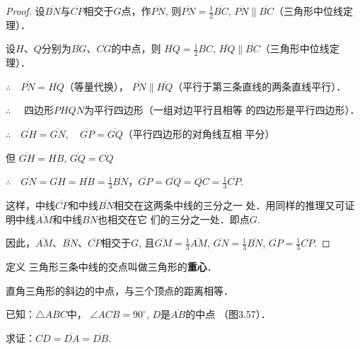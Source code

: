 \begin{proof}
设$\overline{BN}$与$\overline{CP}$相交于$G$点，作$\overline{PN}$, 则$\overline{PN}=\frac{1}{2}\overline{BC}$, 
$\overline{PN}\parallel \overline{BC}$（三角形中位线定理）．

设$H$、$Q$分别为$\overline{BG}$、$\overline{CG}$的中点，则
$\overline{HQ}=\frac{1}{2}\overline{BC}$, $\overline{HQ}\parallel\overline{BC}$（三角形中位线定理）．

$\therefore\quad \overline{PN}=\overline{HQ}$（等量代换），
$\overline{PN}\parallel \overline{HQ}$（平行于第三条直线的两条直线平行）．

$\therefore\quad$ 四边形$PHQN$为平行四边形（一组对边平行且相等
的四边形是平行四边形）．

$\therefore\quad \overline{GH}=\overline{GN},\quad \overline{GP}=\overline{GQ}$（平行四边形的对角线互相
平分）

但 $\overline{GH}=\overline{HB}$, $\overline{GQ}=\overline{CQ}$

$\therefore\quad \overline{GN}=\overline{GH}=\overline{HB}=\frac{1}{3}\overline{BN}$，$\overline{GP}=\overline{GQ}=\overline{QC}=\frac{1}{3}\overline{CP}$.

这样，中线$\overline{CP}$和中线$\overline{BN}$相交在这两条中线的三分之一
处．用同样的推理又可证明中线$\overline{AM}$和中线$\overline{BN}$也相交在它
们的三分之一处．即点$G$. 

因此，$\overline{AM}$、$\overline{BN}$、$\overline{CP}$相交于$G$, 且$\overline{GM}=\frac{1}{3}\overline{AM}$, $\overline{GN}=\frac{1}{3}\overline{BN}$, $\overline{GP}=\frac{1}{3}\overline{CP}$.
\end{proof}

\begin{blk}
    {定义} 三角形三条中线的交点叫做三角形的\textbf{重心}．
\end{blk}

\begin{example}
    直角三角形的斜边的中点，与三个顶点的距离相等．
\end{example}
    
已知：$\triangle ABC$中，
$\angle ACB=90^{\circ}$, 
$D$是$\overline{AB}$的中点
（图3.57）．

求证：$\overline{CD}=\overline{DA}=\overline{DB}$.

